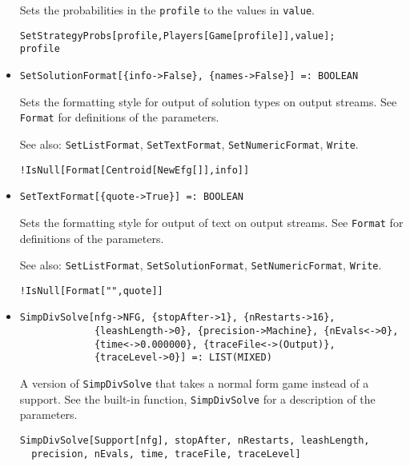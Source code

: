 \begin{itemize}
\bd 
Sets the probabilities in the \verb+profile+ to the values in
\verb+value+.  
\begin{verbatim}
SetStrategyProbs[profile,Players[Game[profile]],value];
profile
\end{verbatim} 
\ed

\item{}
\protect \large \begin{verbatim}
SetSolutionFormat[{info->False}, {names->False}] =: BOOLEAN 
\end{verbatim}\normalsize

\bd Sets the formatting style for output of solution types on output
streams.  See \verb+Format+ for definitions of the parameters.
\item [See also:] \verb+SetListFormat+, \verb+SetTextFormat+, 
\verb+SetNumericFormat+, \verb+Write+.
\begin{verbatim}
!IsNull[Format[Centroid[NewEfg[]],info]]
\end{verbatim} 
\ed

\item{}
\protect \large \begin{verbatim}
SetTextFormat[{quote->True}] =: BOOLEAN 
\end{verbatim}\normalsize

\bd 
Sets the formatting style for output of text on output streams.
See \verb+Format+ for definitions of the parameters.
\item [See also:] \verb+SetListFormat+, \verb+SetSolutionFormat+, 
\verb+SetNumericFormat+, \verb+Write+.
\begin{verbatim}
!IsNull[Format["",quote]]
\end{verbatim} 
\ed

\item{}
\protect \large \begin{verbatim}
SimpDivSolve[nfg->NFG, {stopAfter->1}, {nRestarts->16}, 
             {leashLength->0}, {precision->Machine}, {nEvals<->0}, 
             {time<->0.000000}, {traceFile<->(Output)}, 
             {traceLevel->0}] =: LIST(MIXED) 
\end{verbatim}\normalsize

\bd 
A version of \verb+SimpDivSolve+ that takes a normal form
game instead of a support.  See the built-in function,
\verb+SimpDivSolve+ for a description of the parameters.
\begin{verbatim}
SimpDivSolve[Support[nfg], stopAfter, nRestarts, leashLength,
  precision, nEvals, time, traceFile, traceLevel]
\end{verbatim} 
\ed


\end{itemize}
